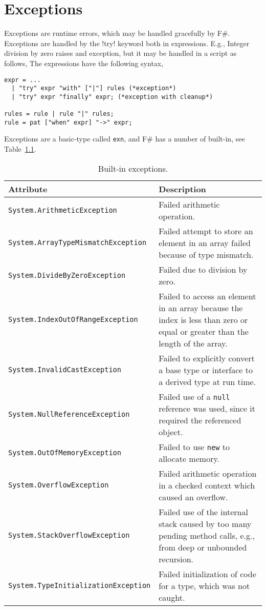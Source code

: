 \chapter{Exceptions}
\label{chap:exceptions}
Exceptions are runtime errors, which may be handled gracefully by F\#. Exceptions are handled by the \keyword!try! keyword both in expressions. E.g., Integer division by zero raises and exception, but it may be handled in a script as follows,
%
%
The  expressions have the following syntax,
%
\begin{lstlisting}[language=ebnf]
expr = ... 
  | "try" expr "with" ["|"] rules (*exception*)
  | "try" expr "finally" expr; (*exception with cleanup*)

rules = rule | rule "|" rules;
rule = pat ["when" expr] "->" expr;
\end{lstlisting}
%
Exceptions are a basic-type called \lstinline!exn!, and F\# has a number of built-in, see Table~\ref{tab:exceptions}.
\begin{table}
  \centering
  \begin{tabularx}{\linewidth}{|l|X|}
    \hline
    Attribute & Description\\
    \hline
    \lstinline!System.ArithmeticException! & Failed arithmetic operation.\\
   \hline
    \lstinline!System.ArrayTypeMismatchException! & Failed attempt to store an element in an array failed because of type mismatch.\\
   \hline
    \lstinline!System.DivideByZeroException! & Failed due to division by zero.\\
   \hline
    \lstinline!System.IndexOutOfRangeException! & Failed to access an element in an array because the index is less than zero or equal or greater than the length of the array.\\
   \hline
    \lstinline!System.InvalidCastException! & Failed to explicitly convert a base type or interface to a derived type at run time.\\
   \hline
    \lstinline!System.NullReferenceException! & Failed use of a \lstinline!null! reference was used, since it required the referenced object.\\
   \hline
    \lstinline!System.OutOfMemoryException! & Failed to use \lstinline!new! to allocate memory.\\ 
   \hline
    \lstinline!System.OverflowException! & Failed arithmetic operation in a checked context which caused an overflow.\\
   \hline
    \lstinline!System.StackOverflowException ! & Failed use of the internal stack caused by too many pending method calls, e.g., from deep or unbounded recursion.\\
   \hline
    \lstinline!System.TypeInitializationException! & Failed initialization of code for a type, which was not caught.\\
   \hline
  \end{tabularx}
  \caption{Built-in exceptions.}
  \label{tab:exceptions}
\end{table}
